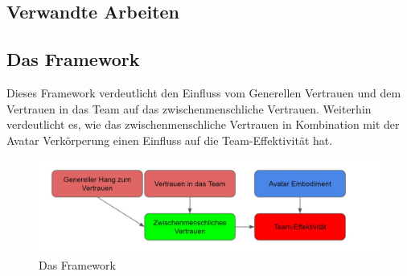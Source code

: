 \documentclass[a4paper,11pt]{article}%
\renewcommand{\\}{\vspace*{0.5\baselineskip} \newline}
\begin{document}
{		\subsection{Verwandte Arbeiten}
	
	
	
	

\subsection{Das Framework}

Dieses Framework verdeutlicht den Einfluss vom Generellen Vertrauen und dem Vertrauen in das Team auf das zwischenmenschliche Vertrauen. 
Weiterhin verdeutlicht es, wie das zwischenmenschliche Vertrauen in Kombination mit der Avatar Verkörperung einen Einfluss auf die Team-Effektivität hat.

	\begin{figure}[H]
		\begin{footnotesize}
			\includegraphics[width=\textwidth]{Abbildungen/Framework.JPG}\\
			\caption[Abbildung 1]{Das Framework}
			\label{Framework}
		\end{footnotesize}
	\end{figure}

}
\end{document}
